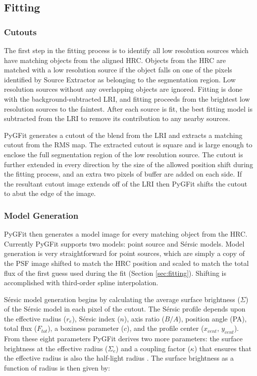 \documentclass[preprint]{aastex}
\newcommand{\sersic}{S\'{e}rsic}
\newcommand{\pygfit}{PyGFit}
\newcommand{\extractor}{Source Extractor}
\begin{document}
\subsection{Fitting}\label{sec:fitting_procedure}

\subsubsection{Cutouts}

The first step in the fitting process is to identify all low resolution sources which have matching objects from the aligned HRC.  Objects from the HRC are matched with a low resolution source if the object falls on one of the pixels identified by \extractor{} as belonging to the segmentation region.  Low resolution sources without any overlapping objects are ignored.  Fitting is done with the background-subtracted LRI, and fitting proceeds from the brightest low resolution sources to the faintest.  After each source is fit, the best fitting model is subtracted from the LRI to remove its contribution to any nearby sources.

\pygfit{} generates a cutout of the blend from the LRI and extracts a matching cutout from the RMS map.  The extracted cutout is square and is large enough to enclose the full segmentation region of the low resolution source.  The cutout is further extended in every direction by the size of the allowed position shift during the fitting process, and an extra two pixels of buffer are added on each side.  If the resultant cutout image extends off of the LRI then \pygfit{} shifts the cutout to abut the edge of the image.

\subsubsection{Model Generation}\label{sec:modeling}

\pygfit{} then generates a model image for every matching object from the HRC.  Currently \pygfit{} supports two models: point source and \sersic{} models.  Model generation is very straightforward for point sources, which are simply a copy of the PSF image shifted to match the HRC position and scaled to match the total flux of the first guess used during the fit (Section \ref{sec:fitting}).  Shifting is accomplished with third-order spline interpolation.

\sersic{} model generation begins by calculating the average surface brightness ($\Sigma$) of the \sersic{} model in each pixel of the cutout.  The \sersic{} profile depends upon the effective radius ($r_e$), \sersic{} index ($n$), axis ratio ($B/A$), position angle (PA), total flux ($F_{tot}$), a boxiness parameter ($c$), and the profile center ($x_{cent}$, $y_{cent}$).  From these eight parameters \pygfit{} derives two more parameters: the surface brightness at the effective radius ($\Sigma_e$) and a coupling factor ($\kappa$) that ensures that the effective radius is also the half-light radius \citep[see for example][]{peng02}.  The surface brightness as a function of radius is then given by:
\end{document}
